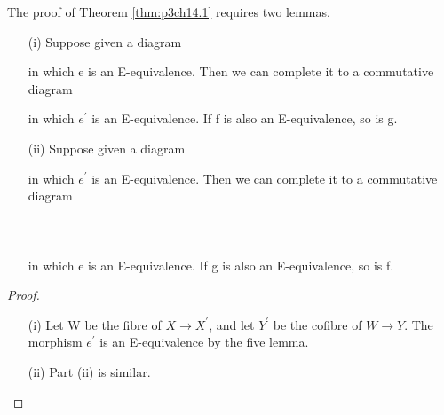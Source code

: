 \documentclass[../main]{subfiles}
\begin{document}
The proof of Theorem \ref{thm:p3ch14.1} requires two lemmas.
\begin{lemma} \label{lem:p3ch14.7}
\begin{enumerate} 
 \item [(i)] Suppose given a diagram

in which e is an E-equivalence. Then we can complete it to a commutative diagram 

in which $e^{\prime}$ is an E-equivalence. If f is also an E-equivalence, so is g.
\item [(ii)] Suppose given a diagram 

      in which $e^{\prime}$ is an E-equivalence. Then we can complete it to a commutative diagram 
~\\~\\
 ~\\~\\
in which e is an E-equivalence. If g is also an E-equivalence, so is f.
  \end{enumerate}
\begin{proof} 
  \begin{enumerate} 
    \item [(i)] Let W be the fibre of $X \to X^{\prime}$, and let $Y^{\prime}$ be the cofibre of $W \to Y$. The morphism $e^{\prime}$ is an E-equivalence by the five lemma.
      \item [(ii)]  Part (ii) is similar. 
  \end{enumerate}   
\end{proof}
  \end{lemma}
\end{document}
